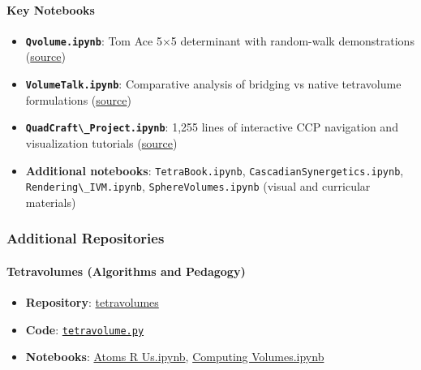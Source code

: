 \documentclass[
  10pt,
]{article}
\newcommand{\passthrough}[1]{#1}
\providecommand{\tightlist}{%
  \setlength{\itemsep}{0pt}\setlength{\parskip}{0pt}}
\begin{document}
\hypertarget{key-notebooks}{%
\paragraph{Key Notebooks}\label{key-notebooks}}

\begin{itemize}
\tightlist
\item
  \textbf{\passthrough{\lstinline!Qvolume.ipynb!}}: Tom Ace 5×5
  determinant with random-walk demonstrations
  (\href{https://github.com/4dsolutions/School_of_Tomorrow/blob/master/Qvolume.ipynb}{source})
\item
  \textbf{\passthrough{\lstinline!VolumeTalk.ipynb!}}: Comparative
  analysis of bridging vs native tetravolume formulations
  (\href{https://github.com/4dsolutions/School_of_Tomorrow/blob/master/VolumeTalk.ipynb}{source})
\item
  \textbf{\passthrough{\lstinline!QuadCraft\_Project.ipynb!}}: 1,255
  lines of interactive CCP navigation and visualization tutorials
  (\href{https://github.com/4dsolutions/School_of_Tomorrow/blob/master/QuadCraft_Project.ipynb}{source})
\item
  \textbf{Additional notebooks}:
  \passthrough{\lstinline!TetraBook.ipynb!},
  \passthrough{\lstinline!CascadianSynergetics.ipynb!},
  \passthrough{\lstinline!Rendering\_IVM.ipynb!},
  \passthrough{\lstinline!SphereVolumes.ipynb!} (visual and curricular
  materials)
\end{itemize}

\hypertarget{additional-repositories}{%
\subsubsection{Additional Repositories}\label{additional-repositories}}

\hypertarget{tetravolumes-algorithms-and-pedagogy}{%
\paragraph{Tetravolumes (Algorithms and
Pedagogy)}\label{tetravolumes-algorithms-and-pedagogy}}

\begin{itemize}
\tightlist
\item
  \textbf{Repository}:
  \href{https://github.com/4dsolutions/tetravolumes}{tetravolumes}
\item
  \textbf{Code}:
  \href{https://github.com/4dsolutions/tetravolumes/blob/master/tetravolume.py}{\passthrough{\lstinline!tetravolume.py!}}
\item
  \textbf{Notebooks}:
  \href{https://raw.githubusercontent.com/4dsolutions/tetravolumes/refs/heads/master/Atoms\%20R\%20Us.ipynb}{Atoms
  R Us.ipynb},
  \href{https://raw.githubusercontent.com/4dsolutions/tetravolumes/refs/heads/master/Computing\%20Volumes.ipynb}{Computing
  Volumes.ipynb}
\end{itemize}
\end{document}
